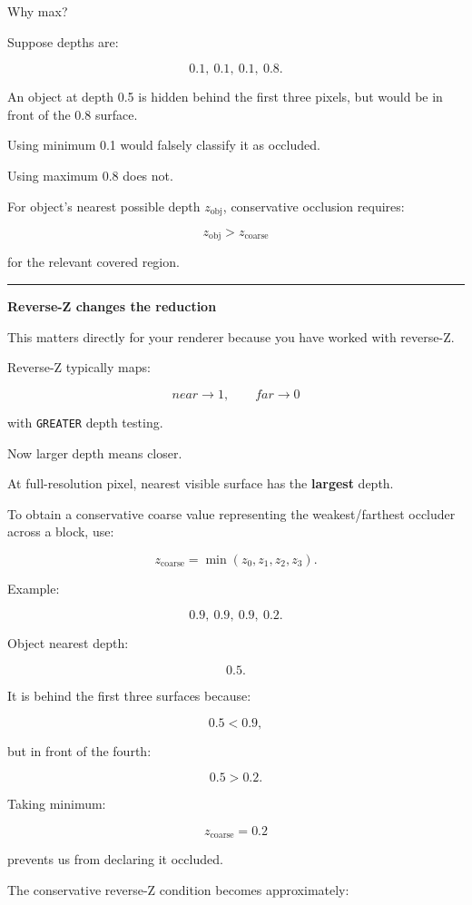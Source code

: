 Why max?

Suppose depths are:

\[
0.1,\ 0.1,\ 0.1,\ 0.8.
\]

An object at depth 0.5 is hidden behind the first three pixels, but would be in front of the 0.8 surface.

Using minimum 0.1 would falsely classify it as occluded.

Using maximum 0.8 does not.

For object's nearest possible depth \(z_{\text{obj}}\), conservative occlusion requires:

\[
\boxed{
z_{\text{obj}}>z_{\text{coarse}}
}
\]

for the relevant covered region.

\begin{center}\rule{0.5\linewidth}{0.5pt}\end{center}

\textbf{Reverse-Z changes the reduction}

This matters directly for your renderer because you have worked with reverse-Z.

Reverse-Z typically maps:

\[
near\rightarrow1,
\qquad
far\rightarrow0
\]

with \texttt{GREATER} depth testing.

Now larger depth means closer.

At full-resolution pixel, nearest visible surface has the \textbf{largest} depth.

To obtain a conservative coarse value representing the weakest/farthest occluder across a block, use:

\[
\boxed{
z_{\text{coarse}}
=
\min(z_0,z_1,z_2,z_3).
}
\]

Example:

\[
0.9,\ 0.9,\ 0.9,\ 0.2.
\]

Object nearest depth:

\[
0.5.
\]

It is behind the first three surfaces because:

\[
0.5<0.9,
\]

but in front of the fourth:

\[
0.5>0.2.
\]

Taking minimum:

\[
z_{\text{coarse}}=0.2
\]

prevents us from declaring it occluded.

The conservative reverse-Z condition becomes approximately:

